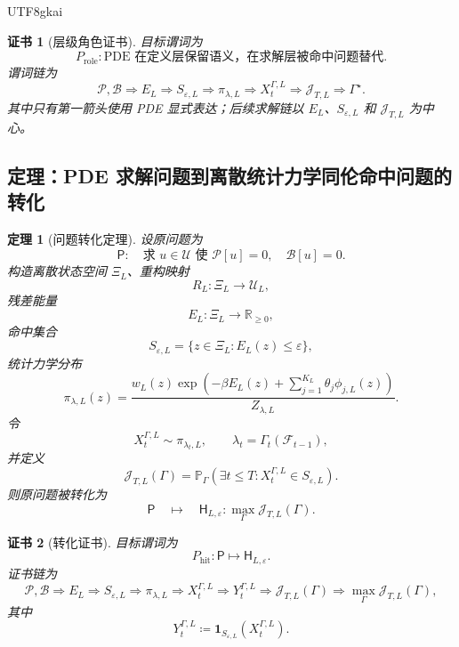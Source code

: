 \documentclass[12pt]{article}
\newtheorem{theorem}{定理}[section]
\newtheorem{Certificate}{证书}[section]
\newcommand{\RR}{\mathbb{R}}
\newcommand{\DefEq}{\coloneqq}
\begin{document}
\begin{CJK*}{UTF8}{gkai}
\begin{Certificate}[层级角色证书]
\label{cert:tex55-pde-role-layer-certificate}
目标谓词为
\[
  P_{\mathrm{role}}:
  \text{PDE 在定义层保留语义，在求解层被命中问题替代}.
\]
谓词链为
\[
  \mathcal P,\mathcal B
  \Longrightarrow
  E_L
  \Longrightarrow
  S_{\varepsilon,L}
  \Longrightarrow
  \pi_{\lambda,L}
  \Longrightarrow
  X_t^{\Gamma,L}
  \Longrightarrow
  \mathcal J_{T,L}
  \Longrightarrow
  \Gamma^\star.
\]
其中只有第一箭头使用 PDE 显式表达；后续求解链以 \(E_L\)、\(S_{\varepsilon,L}\) 和
\(\mathcal J_{T,L}\) 为中心。
\end{Certificate}

\subsection{定理：PDE 求解问题到离散统计力学同伦命中问题的转化}
\label{subsec:tex55-pde-to-hit-theorem}

\begin{theorem}[问题转化定理]
\label{thm:tex55-pde-to-hit-problem-transformation}
设原问题为
\[
  \mathsf P:
  \quad
  \text{求 }u\in\mathcal U
  \text{ 使 }
  \mathcal P[u]=0,
  \quad
  \mathcal B[u]=0.
\]
构造离散状态空间 \(\Xi_L\)、重构映射
\[
  R_L:\Xi_L\to\mathcal U_L,
\]
残差能量
\[
  E_L:\Xi_L\to\RR_{\ge0},
\]
命中集合
\[
  S_{\varepsilon,L}
  =
  \{z\in\Xi_L:E_L(z)\le\varepsilon\},
\]
统计力学分布
\[
  \pi_{\lambda,L}(z)
  =
  \frac{
  w_L(z)
  \exp\!\left(
  -\beta E_L(z)
  +\sum_{j=1}^{K_L}\theta_j\phi_{j,L}(z)
  \right)
  }{
  Z_{\lambda,L}
  }.
\]
令
\[
  X_t^{\Gamma,L}\sim\pi_{\lambda_t,L},
  \qquad
  \lambda_t=\Gamma_t(\mathcal F_{t-1}),
\]
并定义
\[
  \mathcal J_{T,L}(\Gamma)
  =
  \mathbb P_\Gamma
  \left(
  \exists t\le T:
  X_t^{\Gamma,L}\in S_{\varepsilon,L}
  \right).
\]
则原问题被转化为
\[
  \boxed{
  \mathsf P
  \quad
  \longmapsto
  \quad
  \mathsf H_{L,\varepsilon}:
  \max_\Gamma\mathcal J_{T,L}(\Gamma).
  }
\]
\end{theorem}

\begin{Certificate}[转化证书]
\label{cert:tex55-pde-to-hit-transformation}
目标谓词为
\[
  P_{\mathrm{hit}}:
  \mathsf P
  \longmapsto
  \mathsf H_{L,\varepsilon}.
\]
证书链为
\[
  \mathcal P,\mathcal B
  \Longrightarrow
  E_L
  \Longrightarrow
  S_{\varepsilon,L}
  \Longrightarrow
  \pi_{\lambda,L}
  \Longrightarrow
  X_t^{\Gamma,L}
  \Longrightarrow
  Y_t^{\Gamma,L}
  \Longrightarrow
  \mathcal J_{T,L}(\Gamma)
  \Longrightarrow
  \max_\Gamma\mathcal J_{T,L}(\Gamma),
\]
其中
\[
  Y_t^{\Gamma,L}
  \DefEq
  \mathbf 1_{S_{\varepsilon,L}}(X_t^{\Gamma,L}).
\]
\end{Certificate}


\end{CJK*}
\end{document}
